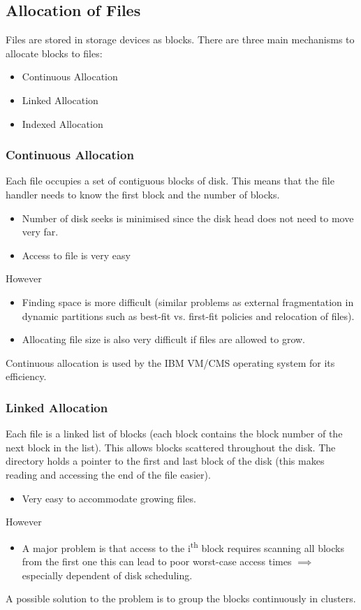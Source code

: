 \documentclass{article}%
\begin{document}
\subsection{Allocation of Files}
\label{sec:org258f65d}
Files are stored in storage devices as blocks.
There are three main mechanisms to allocate blocks to files:
\begin{itemize}
\item Continuous Allocation
\item Linked Allocation
\item Indexed Allocation
\end{itemize}

\subsubsection{Continuous Allocation}
\label{sec:orge427d76}
Each file occupies a set of contiguous blocks of disk.
This means that the file handler needs to know the first block and the number of blocks.
\begin{itemize}
\item Number of disk seeks is minimised since the disk head does not need to move very far.
\item Access to file is very easy
\end{itemize}
However
\begin{itemize}
\item Finding space is more difficult (similar problems as external fragmentation in dynamic partitions such as best-fit vs. first-fit policies and relocation of files).
\item Allocating file size is also very difficult if files are allowed to grow.
\end{itemize}
Continuous allocation is used by the IBM VM/CMS operating system for its efficiency.

\subsubsection{Linked Allocation}
\label{sec:org0469cd3}
Each file is a linked list of blocks (each block contains the block number of the next block in the list).
This allows blocks scattered throughout the disk.
The directory holds a pointer to the first and last block of the disk (this makes reading and accessing the end of the file easier).
\begin{itemize}
\item Very easy to accommodate growing files.
\end{itemize}
However
\begin{itemize}
\item A major problem is that access to the i\textsuperscript{th} block requires scanning all blocks from the first one this can lead to poor worst-case access times \(\implies\) especially dependent of disk scheduling.
\end{itemize}
A possible solution to the problem is to group the blocks continuously in clusters.
\end{document}
